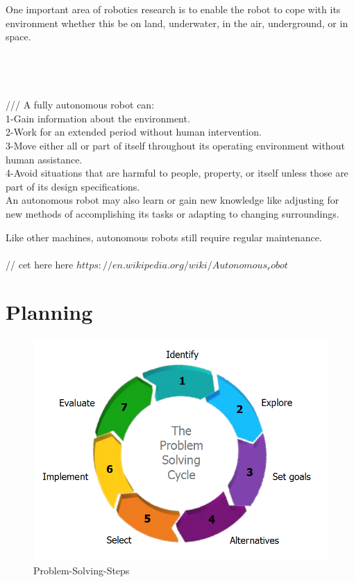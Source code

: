 \documentclass[11pt]{report}
\begin{document}
		One important area of robotics research is to enable the robot to cope with its environment whether this be on land, underwater, in the air, underground, or in space.
		\\ \\ \\ \\ \\
///		A fully autonomous robot can:\\
			1-Gain information about the environment.\\
			2-Work for an extended period without human intervention.\\
			3-Move either all or part of itself throughout its operating environment without human assistance.\\
			4-Avoid situations that are harmful to people, property, or itself unless those are part of its design specifications.\\
			
			An autonomous robot may also learn or gain new knowledge like adjusting for new methods of accomplishing its tasks or adapting to changing surroundings.

		Like other machines, autonomous robots still require regular maintenance.\\ \\
// cet here here $https://en.wikipedia.org/wiki/Autonomous_robot$
	
	\newpage
	\chapter{Planning }
		\begin{figure}[ht]
			\begin{center}
				\includegraphics[scale=0.3]{Ch2-Planning/Problem-Solving-Steps}
				\caption{Problem-Solving-Steps}
			\end{center}
		\end{figure}
		
\end{document}
